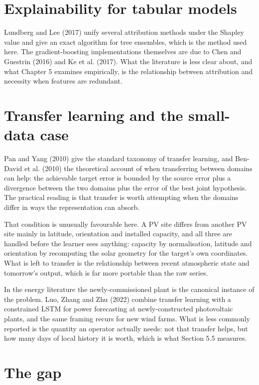 \documentclass[11pt,a4paper,oneside]{report}
\begin{document}
\section{Explainability for tabular models}

Lundberg and Lee (2017) unify several attribution methods under the Shapley value and give an exact algorithm for tree ensembles, which is the method used here. The gradient-boosting implementations themselves are due to Chen and Guestrin (2016) and Ke et al. (2017). What the literature is less clear about, and what Chapter 5 examines empirically, is the relationship between attribution and necessity when features are redundant.

\section{Transfer learning and the small-data case}

Pan and Yang (2010) give the standard taxonomy of transfer learning, and Ben-David et al. (2010) the theoretical account of when transferring between domains can help: the achievable target error is bounded by the source error plus a divergence between the two domains plus the error of the best joint hypothesis. The practical reading is that transfer is worth attempting when the domains differ in ways the representation can absorb.

That condition is unusually favourable here. A PV site differs from another PV site mainly in latitude, orientation and installed capacity, and all three are handled before the learner sees anything: capacity by normalisation, latitude and orientation by recomputing the solar geometry for the target's own coordinates. What is left to transfer is the relationship between recent atmospheric state and tomorrow's output, which is far more portable than the raw series.

In the energy literature the newly-commissioned plant is the canonical instance of the problem. Luo, Zhang and Zhu (2022) combine transfer learning with a constrained LSTM for power forecasting at newly-constructed photovoltaic plants, and the same framing recurs for new wind farms. What is less commonly reported is the quantity an operator actually needs: not that transfer helps, but how many days of local history it is worth, which is what Section 5.5 measures.

\section{The gap}
\end{document}
